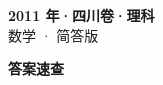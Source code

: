 \documentclass[zihao=-4, a4paper]{ctexart}
\begin{document}
\begin{center}
  {\Large\bfseries 2011 年·四川卷·理科}\\[4pt]
  {\large 数学 · 简答版}
\end{center}
\medskip
{}

\clearpage
{}
\begin{center}{\Large\bfseries 答案速查}\end{center}
\medskip

\end{document}
